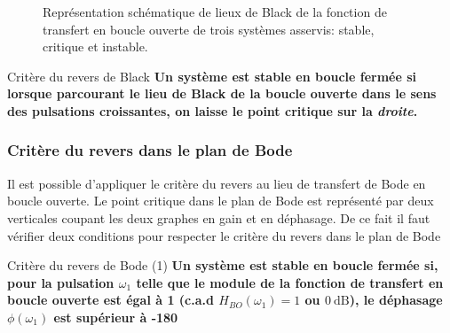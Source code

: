 \begin{figure}[!h]
\begin{center}
\end{center}
\caption{Représentation schématique de lieux de Black de la 
    fonction de transfert en boucle ouverte de trois systèmes 
    asservis: stable, critique et instable.
\label{fig-black_revers}}
\end{figure}

\begin{criteria}{Critère du revers de Black}
\textbf{Un système est stable en boucle fermée si lorsque parcourant 
        le lieu de Black de la boucle ouverte dans le sens des 
        pulsations croissantes, on laisse le point critique sur la \emph{droite}.}
\end{criteria}
\newpage
\subsubsection{Critère du revers dans le plan de Bode}

Il est possible d'appliquer le critère du revers au lieu de transfert de Bode
en boucle ouverte. Le point critique
dans le plan de Bode est représenté par deux verticales coupant les deux graphes en gain et en déphasage.
De ce fait il faut vérifier deux conditions pour respecter le critère du revers dans le plan de Bode

\begin{criteria}{Critère du revers de Bode (1)}
\textbf{Un système est stable en boucle fermée si, pour la pulsation $\omega_{1}$ telle que le module 
    de la fonction de transfert en boucle ouverte est égal à 1 (c.a.d $H_{BO}(\omega_{1})=1$ 
    ou $\SI{0}{\dB}$), le déphasage $\phi(\omega_1)$ est supérieur à -180\degree}
\end{criteria}

